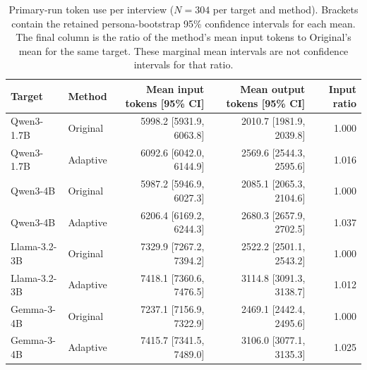\documentclass{ieeeaccess}
\begin{document}
\renewcommand{\thetable}{S7}
\begin{table}[H]
\centering
\footnotesize
\setlength{\tabcolsep}{3pt}
\caption{Primary-run token use per interview ($N=304$ per target and method). Brackets
contain the retained persona-bootstrap 95\% confidence intervals for each mean. The final
column is the ratio of the method's mean input tokens to Original's mean for the same target.
These marginal mean intervals are not confidence intervals for that ratio.}
\label{tab:primary-token-uncertainty}
\begin{tabular*}{\textwidth}{@{\extracolsep{\fill}}llrrr@{}}
\toprule
Target & Method & Mean input tokens [95\% CI] & Mean output tokens [95\% CI] & Input ratio \\
\midrule
Qwen3-1.7B & Original & 5998.2 [5931.9, 6063.8] & 2010.7 [1981.9, 2039.8] & 1.000 \\
Qwen3-1.7B & Adaptive & 6092.6 [6042.0, 6144.9] & 2569.6 [2544.3, 2595.6] & 1.016 \\
Qwen3-4B & Original & 5987.2 [5946.9, 6027.3] & 2085.1 [2065.3, 2104.6] & 1.000 \\
Qwen3-4B & Adaptive & 6206.4 [6169.2, 6244.3] & 2680.3 [2657.9, 2702.5] & 1.037 \\
Llama-3.2-3B & Original & 7329.9 [7267.2, 7394.2] & 2522.2 [2501.1, 2543.2] & 1.000 \\
Llama-3.2-3B & Adaptive & 7418.1 [7360.6, 7476.5] & 3114.8 [3091.3, 3138.7] & 1.012 \\
Gemma-3-4B & Original & 7237.1 [7156.9, 7322.9] & 2469.1 [2442.4, 2495.6] & 1.000 \\
Gemma-3-4B & Adaptive & 7415.7 [7341.5, 7489.0] & 3106.0 [3077.1, 3135.3] & 1.025 \\
\bottomrule
\end{tabular*}
\end{table}

\clearpage
\end{document}
